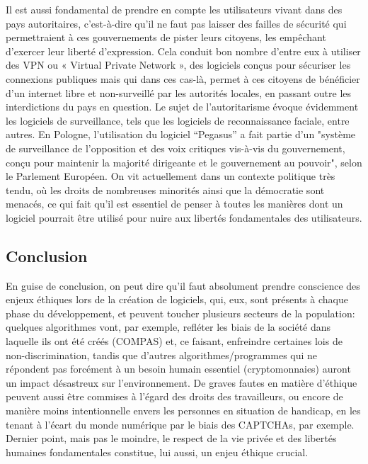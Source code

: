 \documentclass{article}
\begin{document}
Il est aussi fondamental de prendre en compte les utilisateurs vivant dans des pays autoritaires, c’est-à-dire qu’il ne faut pas laisser des failles de sécurité qui permettraient à ces gouvernements de pister leurs citoyens, les empêchant d’exercer leur liberté d’expression. Cela conduit bon nombre d’entre eux à utiliser des VPN ou « Virtual Private Network », des logiciels conçus pour sécuriser les connexions publiques mais qui dans ces cas-là, permet à ces citoyens de bénéficier d’un internet libre et non-surveillé par les autorités locales, en passant outre les interdictions du pays en question. Le sujet de l’autoritarisme évoque évidemment les logiciels de surveillance, tels que les logiciels de reconnaissance faciale, entre autres. En Pologne, l’utilisation du logiciel “Pegasus” a fait partie d’un "système de surveillance de l'opposition et des voix critiques vis-à-vis du gouvernement, conçu pour maintenir la majorité dirigeante et le gouvernement au pouvoir", selon le Parlement Européen. On vit actuellement dans un contexte politique très tendu, où les droits de nombreuses minorités ainsi que la démocratie sont menacés, ce qui fait qu’il est essentiel de penser à toutes les manières dont un logiciel pourrait être utilisé pour nuire aux libertés fondamentales des utilisateurs.\\

\subsection{Conclusion}
En guise de conclusion, on peut dire qu’il faut absolument prendre conscience des enjeux éthiques lors de la création de logiciels, qui, eux, sont présents à chaque phase du développement, et peuvent toucher plusieurs secteurs de la population: quelques algorithmes vont, par exemple, refléter les biais de la société dans laquelle ils ont été créés (COMPAS) et, ce faisant, enfreindre certaines lois de non-discrimination, tandis que d’autres algorithmes/programmes qui ne répondent pas forcément à un besoin humain essentiel (cryptomonnaies) auront un impact désastreux sur l’environnement. De graves fautes en matière d’éthique peuvent aussi être commises à l’égard des droits des travailleurs, ou encore de manière moins intentionnelle envers les personnes en situation de handicap, en les tenant à l’écart du monde numérique par le biais des CAPTCHAs, par exemple. Dernier point, mais pas le moindre, le respect de la vie privée et des libertés humaines fondamentales constitue, lui aussi, un enjeu éthique crucial. \\
\end{document}
